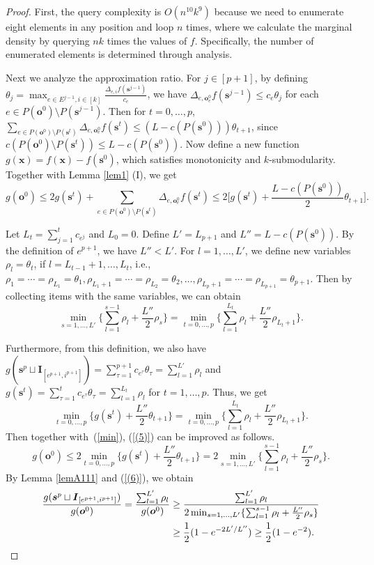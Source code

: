 \documentclass[preprint,12pt]{elsarticle}
\newcommand{\be}{\begin{equation}}
\newcommand{\ee}{\end{equation}}
\def\bo{\boldsymbol{o}}
\def\bs{\boldsymbol{s}}
\def\bx{\boldsymbol{x}}
\def\bI{\boldsymbol{I}}
\begin{document}
\begin{proof}
First, the query complexity is $O(n^{10}k^9)$ because we need to enumerate eight elements in any position and loop $n$ times, where we calculate the marginal density by querying $n k$ times the values of $f$.  Specifically, the number of enumerated elements is determined through analysis.

Next we analyze the approximation ratio.
For $j\in [p+1]$, by defining $\theta_j=\max_{e\in E^{j-1}, i\in[k]}\frac{\Delta_{e, i}f(\bs^{j-1})}{c_e}$, we have $\Delta_{e, \bo^0_e}f(\bs^{j-1})\le c_e\theta_{j}$ for each $e\in P(\bo^0)\setminus P(\bs^{j-1})$.
Then for $t=0, \dots, p$, $\sum_{e\in P(\bo^0)\setminus P(\bs^t)} \Delta_{e, \bo^0_e}f(\bs^t) \leq (L-c(P(\bs^0)))\theta_{t+1}$, since $c(P(\bo^0)\setminus P(\bs^t))\le L-c(P(\bs^0))$.
Now define a new function $g(\bx)=f(\bx)-f(\bs^0)$, which satisfies monotonicity and $k$-submodularity.
Together with Lemma \ref{lem1} (I), we get
\be\label{(5)}
g(\bo^0)
\leq  2g(\bs^t)+\sum_{e\in P(\bo^0)\setminus P(\bs^t)}\Delta_{e, \bo^0_e}f(\bs^t)
\leq 2\big[g(\bs^t)+\frac{L-c(P(\bs^0))}{2}\theta_{t+1}\big].
\ee

Let $L_t=\sum_{j=1}^t c_{e^j}$ and $L_0=0$. Define $L'=L_{p+1}$ and $L''=L-c(P(\bs^0))$. By the definition of $e^{p+1}$, we have $L'' < L'$.
For $l=1, \dots, L'$, we define new variables $\rho_l=\theta_{t}$, if $l=L_{t-1}+1, \dots, L_t$, i.e., $\rho_1=\cdots=\rho_{L_1}=\theta_1,\rho_{L_1+1}=\cdots=\rho_{L_2}=\theta_2,\ldots,\rho_{L_p+1}=\cdots=\rho_{L_{p+1}}=\theta_{p+1}$. Then by collecting items with the same variables, we can obtain
\be\label{min}
\min_{s=1, \dots, L'}\{\sum_{l=1}^{s-1}\rho_l+\frac{L''}{2}\rho_s\}=\min_{t=0, \dots, p}\{\sum_{l=1}^{L_t}\rho_l+\frac{L''}{2}\rho_{L_t+1}\}.
\ee

Furthermore, from this definition, we also have $g(\bs^{p}\sqcup\bI_{[e^{p+1}, i^{p+1}]})=\sum_{\tau=1}^{p+1}c_{e^{\tau}}\theta_{\tau}=\sum_{l=1}^{L'}\rho_l$ and $g(\bs^t)=\sum_{\tau=1}^tc_{e^{\tau}}\theta_{\tau}=\sum_{l=1}^{L_t}\rho_l$ for $t=1, \dots, p$.
Thus, we get
\[
\min_{t=0, \dots, p}\{g(\bs^t)+\frac{L''}{2}\theta_{t+1}\}=\min_{t=0, \dots, p}\{\sum_{l=1}^{L_t}\rho_l+\frac{L''}{2}\rho_{L_t+1}\}.
\]
Then together with~(\ref{min}), (\ref{(5)}) can be improved as follows.
\be\label{(6)}
g(\bo^0)
\le  2\min_{t=0, \dots, p}\{g(\bs^t)+\frac{L''}{2}\theta_{t+1}\}
=  2\min_{s=1, \dots, L'}\{\sum_{l=1}^{s-1}\rho_l+\frac{L''}{2}\rho_s\}.
\ee
By Lemma \ref{lemA111} and (\ref{(6)}), we obtain
\begin{align}\label{(7)}
\frac{g(\bs^{p}\sqcup\bI_{[e^{p+1}, i^{p+1}]})}{g(\bo^0)} \notag
= \frac{\sum_{l=1}^{L'}\rho_l}{g(\bo^0)}
\ge{} & \frac{\sum_{l=1}^{L'}\rho_l}{2\min_{s=1, \dots, L'}\{\sum_{l=1}^{s-1}\rho_l+\frac{L''}{2}\rho_s\}} \\
\ge{} & \frac{1}{2}(1-e^{-2L'/L''}) \geq \frac{1}{2}(1-e^{-2}).
\end{align}


\end{proof}
\end{document}
